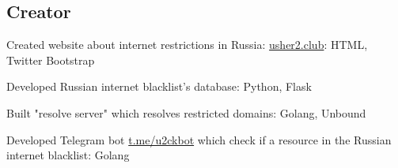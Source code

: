 \documentclass[letter,10pt]{article}
\begin{document}
\subsection{{Creator}}
\begin{zitemize}
\item Created website about internet restrictions in Russia: \href{https://usher2.club}{usher2.club}: HTML, Twitter Bootstrap
\item Developed Russian internet blacklist's database: Python, Flask
\item Built "resolve server" which resolves restricted domains: Golang, Unbound
\item Developed Telegram bot \href{https://t.me/u2ckbot}{t.me/u2ckbot} which check if a resource in the Russian internet blacklist: Golang
\end{zitemize}
\end{document}
